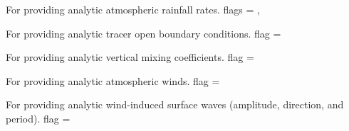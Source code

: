 \begin{klist}
For providing analytic atmospheric rainfall rates.
 flags = , 

For providing analytic tracer open boundary conditions.
 flag = 

For providing analytic vertical mixing coefficients.
 flag = 

For providing analytic atmospheric winds.
 flag = 

For providing analytic wind-induced surface waves (amplitude,
direction, and period).
 flag = 
\end{klist}
